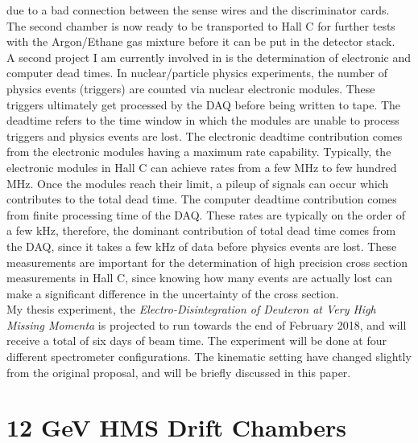 \documentclass[letterpaper, 10 pt, conference]{ieeeconf}  %
\begin{document}
due to a bad connection between the sense wires and the discriminator cards. The second chamber is now ready to be transported to Hall C for further tests with the
Argon/Ethane gas mixture before it can be put in the detector stack.\\
\indent A second project I am currently involved in is the determination of electronic and computer dead times. In nuclear/particle physics experiments,
the number of physics events (triggers) are counted via nuclear electronic modules. These triggers ultimately get processed by the DAQ before being
written to tape. The deadtime refers to the time window in which the modules are unable to process triggers and physics events are lost.
The electronic deadtime contribution comes from the electronic modules having a maximum rate capability. Typically,
the electronic modules in Hall C can achieve rates from a few MHz to few hundred MHz. Once the modules reach their limit, a pileup of signals can occur which
contributes to the total dead time. The computer deadtime contribution comes from finite processing time of the DAQ. These rates are typically on the order of
a few kHz, therefore, the dominant contribution of total dead time comes from the DAQ, since it takes a few kHz of data before physics events
are lost. These measurements are important for the determination of high precision cross section measurements in Hall C, since knowing how many events
are actually lost can make a significant difference in the uncertainty of the cross section. \\
\indent My thesis experiment, the \textit{Electro-Disintegration of Deuteron at Very High Missing Momenta} is projected to run towards the end of
February 2018, and will receive a total of six days of beam time. The experiment will be done at four different spectrometer configurations. The kinematic
setting have changed slightly from the original proposal, and will be briefly discussed in this paper. 


\section{12 GeV HMS Drift Chambers}
\end{document}
